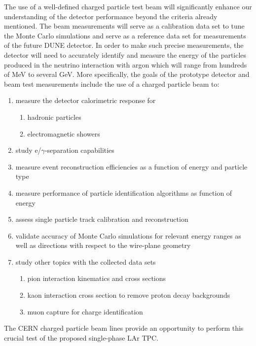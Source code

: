 The use of a well-defined charged particle test beam will significantly enhance our understanding of the detector performance beyond the criteria already mentioned.
The beam measurements will serve as a calibration data set to tune the Monte Carlo simulations and serve as a reference data set for measurements of the future DUNE detector. 
%
In order to make such precise measurements, the detector will need to accurately identify and measure the energy of the particles produced in the neutrino interaction with argon which will range from hundreds of MeV to several GeV.
%
More specifically, the goals of the prototype detector and beam test measurements include the use of a charged particle beam to:
\begin{enumerate}
\item measure the detector calorimetric response for
\begin{enumerate}
	\item hadronic particles
	\item electromagnetic showers
\end{enumerate}
\item study e/$\gamma$-separation capabilities
\item measure event reconstruction efficiencies as a function of energy and particle type
\item measure performance of particle identification algorithms as function of energy 
\item assess single particle track calibration and reconstruction
\item validate accuracy of Monte Carlo simulations for relevant energy ranges as well as directions with respect to the wire-plane geometry

\item study other topics with the collected data sets
 \begin{enumerate}
    \item pion interaction kinematics and cross sections
    \item kaon interaction cross section to remove proton decay backgrounds
    \item muon capture for charge identification
 \end{enumerate}
\end{enumerate}
%
The CERN charged particle beam lines provide an opportunity to perform this crucial test of the 
proposed single-phase LAr TPC.
%
%


